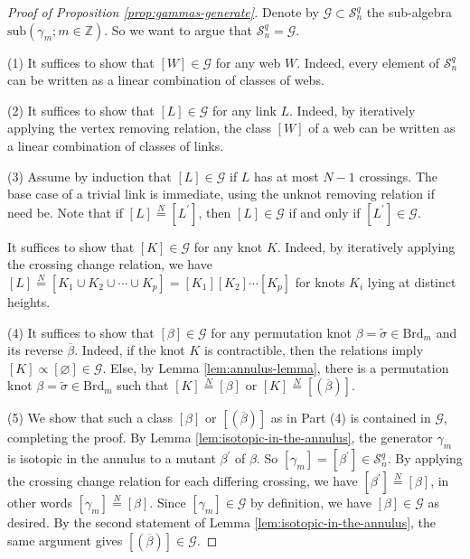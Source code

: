 \documentclass[12pt,
	]{amsart}
\theoremstyle{definition}
\renewcommand{\bar}{\overline}
\renewcommand{\tilde}{\widetilde}
\renewcommand{\emptyset}{\varnothing}
\newcommand{\mrm}[1]{\mathrm{#1}}
\newcommand{\mbb}[1]{\mathbb{#1}}
\newcommand{\mcal}[1]{\mathcal{#1}}
\newcommand{\lp}{\left(}\newcommand{\rp}{\right)}
\newcommand{\sub}[1]{\mrm{sub}\lp#1\rp}
\newcommand{\class}[1]{\left[#1\right]}
\newcommand{\rev}[1]{\bar{#1}}
\newcommand{\lift}[1]{\tilde{#1}}
\newcommand{\Z}{\mbb{Z}}
\newcommand{\sk}{\mcal{S}_n^q}
\newcommand{\braid}{\mrm{Brd}}
\newcommand{\gen}{\mcal{G}}
\newcommand{\indeq}{\overset{N}{=}}
\begin{document}
\begin{proof}[Proof of Proposition {\upshape\ref{prop:gammas-generate}}]
Denote by $\gen\subset\sk$ the sub-algebra $\sub{\gamma_m;m\in\Z}$.  So we want to argue that $\sk=\gen$.  

(1) It suffices to show that $\class{W}\in\gen$ for any web $W$.  Indeed, every element of $\sk$ can be written as a linear combination of classes of webs.  

(2)  It suffices to show that $\class{L}\in\gen$ for any link $L$.  Indeed, by iteratively applying the vertex removing relation, the class $\class{W}$ of a web can be written as a linear combination of classes of links.  

(3)  Assume by induction that $\class{L}\in\gen$ if $L$ has at most $N-1$ crossings.  The base case of a trivial link is immediate, using the unknot removing relation if need be.  Note that if $\class{L}\indeq\class{L^\prime}$, then  $\class{L}\in\gen$ if and only if $\class{L^\prime}\in\gen$.

It suffices to show that $\class{K}\in\gen$ for any knot $K$.  Indeed, by iteratively applying the crossing change relation, we have $\class{L}\indeq\class{K_1\cup K_2\cup\cdots\cup K_p}=\class{K_1}\class{K_2}\cdots\class{K_p}$ for knots $K_i$ lying at distinct heights.  

(4)  It suffices to show that $\class{\beta}\in\gen$ for any permutation knot $\beta=\lift{\sigma}\in\braid_m$ and its reverse $\rev{\beta}$.  Indeed, if the knot $K$ is contractible, then the relations imply $\class{K}\propto\class{\emptyset}\in\gen$.  Else, by Lemma \ref{lem:annulus-lemma}, there is a permutation knot $\beta=\lift{\sigma}\in\braid_m$ such that $\class{K}\indeq\class{\beta}$ or $\class{K}\indeq\class{\lp\rev{\beta}\rp}$.

(5)  We show that such a class $\class{\beta}$ or $\class{\lp\rev{\beta}\rp}$ as in Part (4) is contained in $\gen$, completing the proof.  By Lemma \ref{lem:isotopic-in-the-annulus}, the generator $\gamma_m$ is isotopic in the annulus to a mutant $\beta^{\prime}$ of $\beta$.  So $\class{\gamma_m}=\class{\beta^{\prime}}\in\sk$.  By applying the crossing change relation for each differing crossing, we have $\class{\beta^{\prime}}\indeq\class{\beta}$, in other words $\class{\gamma_m}\indeq\class{\beta}$.  Since $\class{\gamma_m}\in\gen$ by definition, we have $\class{\beta}\in\gen$ as desired.  By the second statement of Lemma \ref{lem:isotopic-in-the-annulus}, the same argument gives $\class{\lp\rev{\beta}\rp}\in\gen$.
\end{proof}
\end{document}
